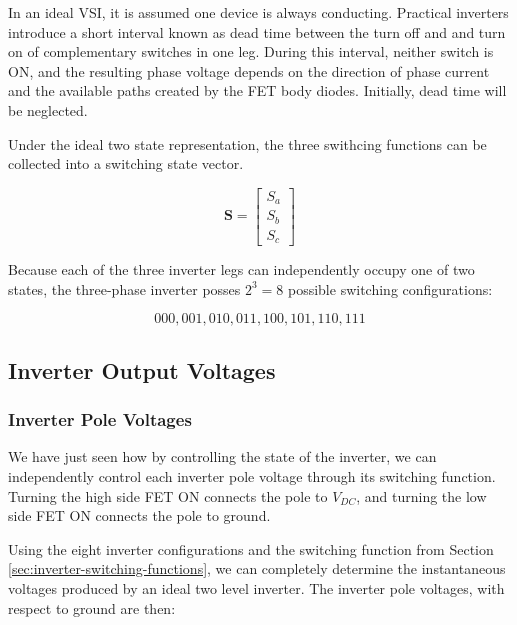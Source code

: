 \documentclass{article}
\begin{document}
In an ideal VSI, it is assumed one device is always conducting. Practical inverters introduce a short interval known as dead time between the turn off and and turn on of complementary switches in one leg. During this interval, neither switch is ON, and the resulting phase voltage depends on the direction of phase current and the available paths created by the FET body diodes. Initially, dead time will be neglected.

Under the ideal two state representation, the three swithcing functions can be collected into a switching state vector. 

\[
\mathbf{S} = 
\begin{bmatrix}
    S_a \\
    S_b \\
    S_c
\end{bmatrix}
\]

Because each of the three inverter legs can independently occupy one of two states, the three-phase inverter posses $2^3 = 8$ possible switching configurations:

\[
    000, 001, 010, 011, 100, 101, 110, 111
\]


\subsection{Inverter Output Voltages}
\label{sec:inverter-output-voltages}

\subsubsection{Inverter Pole Voltages}
\label{sec:inverter-pole-voltages}

We have just seen how by controlling the state of the inverter, we can independently control each inverter pole voltage through its switching function. Turning the high side FET ON connects the pole to $V_{DC}$, and turning the low side FET ON connects the pole to ground.

Using the eight inverter configurations and the switching function from Section \ref{sec:inverter-switching-functions}, we can completely determine the instantaneous voltages produced by an ideal two level inverter. The inverter pole voltages, with respect to ground are then:
\end{document}
